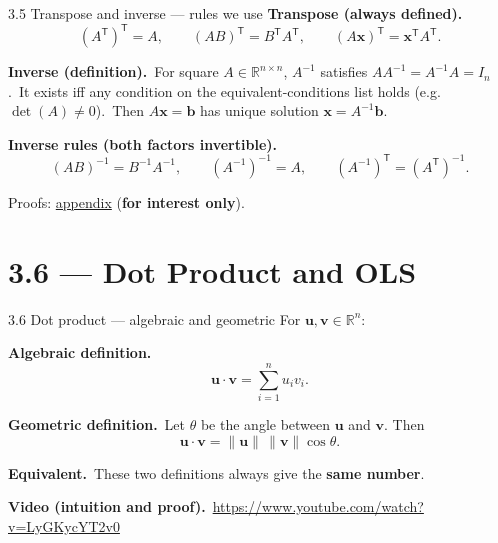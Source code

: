 \documentclass[11pt,aspectratio=169]{beamer}
\newcommand{\InterestOnly}{\textcolor{mAccent}{\textbf{for interest only}}}
\newcommand{\AppendixLink}[1]{%
  \hyperlink{#1}{\textcolor{mAccent}{appendix}}}
\begin{document}
\begin{frame}{3.5 Transpose and inverse --- rules we use}
  \footnotesize
  \textbf{Transpose (always defined).}\
  \[
    (A^{\mathsf T})^{\mathsf T}=A,
    \qquad
    (AB)^{\mathsf T}=B^{\mathsf T}A^{\mathsf T},
    \qquad
    (A\mathbf{x})^{\mathsf T}=\mathbf{x}^{\mathsf T}A^{\mathsf T}.
  \]

  \medskip
  \textbf{Inverse (definition).}\
  For square $A\in\mathbb{R}^{n\times n}$, $A^{-1}$ satisfies $AA^{-1}=A^{-1}A=I_n$.\
  It exists iff any condition on the equivalent-conditions list holds (e.g.\ $\det(A)\neq 0$).\
  Then $A\mathbf{x}=\mathbf{b}$ has unique solution $\mathbf{x}=A^{-1}\mathbf{b}$.

  \medskip
  \textbf{Inverse rules (both factors invertible).}\
  \[
    (AB)^{-1}=B^{-1}A^{-1},
    \qquad
    (A^{-1})^{-1}=A,
    \qquad
    (A^{-1})^{\mathsf T}=(A^{\mathsf T})^{-1}.
  \]

  \medskip
  {\scriptsize Proofs: \AppendixLink{sec:transpose-inverse-proofs} (\InterestOnly).}
\end{frame}

\section{3.6 --- Dot Product and OLS}

\begin{frame}{3.6 Dot product --- algebraic and geometric}
  \footnotesize
  For $\mathbf{u},\mathbf{v}\in\mathbb{R}^n$:

  \medskip
  \textbf{Algebraic definition.}
  \[
    \mathbf{u}\cdot\mathbf{v}=\sum_{i=1}^n u_i v_i.
  \]

  \medskip
  \textbf{Geometric definition.}\
  Let $\theta$ be the angle between $\mathbf{u}$ and $\mathbf{v}$. Then
  \[
    \mathbf{u}\cdot\mathbf{v}=\|\mathbf{u}\|\,\|\mathbf{v}\|\cos\theta.
  \]

  \medskip
  \textbf{Equivalent.}\
  These two definitions always give the \textbf{same number}.

  \medskip
  \textbf{Video (intuition and proof).}\
  \href{https://www.youtube.com/watch?v=LyGKycYT2v0}{\textcolor{mAccent}{https://www.youtube.com/watch?v=LyGKycYT2v0}}
\end{frame}
\end{document}
